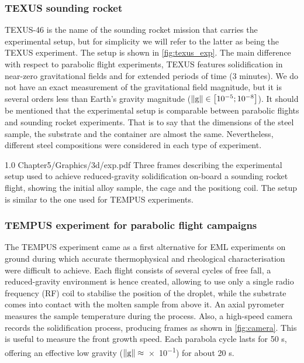 \subsubsection{TEXUS sounding rocket}
TEXUS-46 is the name of the sounding rocket mission that carries the experimental setup, 
but for simplicity we will refer to the latter as being the TEXUS experiment. The setup is shown in \cref{fig:texus_exp}.
The main difference with respect to parabolic flight experiments,
TEXUS features solidification in near-zero gravitational fields and for extended periods of time (3 minutes). 
We do not have an exact measurement of the gravitational field magnitude, but it is several orders
less than Earth's gravity magnitude ($\lVert \boldsymbol{\text{g}} \rVert \in \left[ 10^{-5};10^{-8} \right]$\si{\uacceleration}).
It should be mentioned that the experimental setup is comparable between parabolic flights and sounding rocket experiments. That is to say
that the dimensions of the steel sample, the substrate and the container are almost the same. Nevertheless, different steel compositions were
considered in each type of experiment.

\begin{figureth}
{1.0}
{Chapter5/Graphics/3d/exp.pdf}
{Three frames describing the experimental setup used to achieve reduced-gravity 
solidification on-board a sounding rocket flight,
showing the initial alloy sample, the cage and the positiong coil. The setup
is similar to the one used for TEMPUS experiments.}
\label{fig:texus_exp}
\end{figureth}


\subsubsection{TEMPUS experiment for parabolic flight campaigns}

The TEMPUS experiment came as a first alternative for EML experiments on ground during which accurate thermophysical and rheological characterisation were difficult to achieve.
Each flight consists of several cycles of free fall, a reduced-gravity environment is hence created, 
allowing to use only a single radio frequency (RF) coil to stabilise the position of the droplet, while the substrate comes into contact with the molten sample
from above it. An axial pyrometer measures the sample temperature during the process. 
Also, a high-speed camera records the solidification process, producing frames as shown in \cref{fig:camera}.
This is useful to measure the front growth speed. 
Each parabola cycle lasts for 50 s, offering an effective low gravity ($\lVert \boldsymbol{\text{g}} \rVert\approx$\SI{e-1}{\uacceleration}) for about 20 s.



